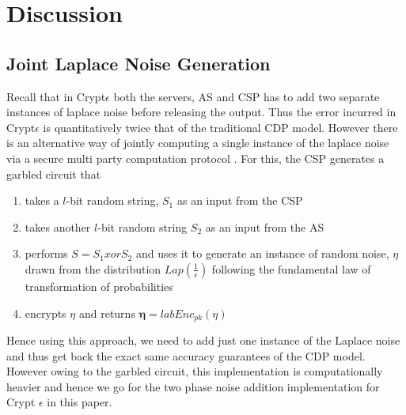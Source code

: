 \section{Discussion}
\subsection{Joint Laplace Noise Generation}
Recall that in Crypt$\epsilon$ both the servers, \textsf{AS} and \textsf{CSP} has to add two separate instances of laplace noise before releasing the output. Thus the error incurred in Crypt$\epsilon$ is quantitatively twice that of the traditional \textsf{CDP} model. However there is an alternative way of jointly computing a single instance of the laplace noise via a secure multi party computation protocol \cite{Djoin}. For this, the CSP generates a garbled circuit that \begin{enumerate}\item takes a $l$-bit random string, $S_1$ as an input from the \textsf{CSP}
    \item takes another $l$-bit random string $S_2$ as an input from the \textsf{AS} \item performs $S=S_1 xor S_2$  and uses it to generate an instance of random noise, $\eta$ drawn from the distribution $Lap(\frac{1}{\epsilon})$ following the fundamental law of transformation of probabilities \item encrypts $\eta$ and returns $\boldsymbol{\eta}=labEnc_{pk}(\eta)$\end{enumerate}
Hence using this approach, we need to add just one instance of the Laplace noise and thus get back the exact same accuracy guarantees of the \textsf{CDP} model. However owing to the garbled circuit, this implementation is computationally heavier and hence we go for the two phase noise addition implementation for Crypt $\epsilon$ in this paper.
